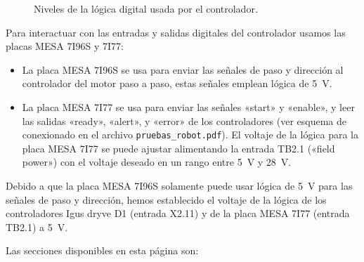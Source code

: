 \documentclass[english,spanish,a4paper,11pt]{article}
\begin{document}
\begin{figure}[!ht]
    \centering
    
    \caption{Niveles de la lógica digital usada por el controlador.}
    \label{fig:controller_logic_levels}
\end{figure}

Para interactuar con las entradas y salidas digitales del controlador usamos las placas MESA 7I96S y 7I77:
\begin{itemize}
    \item La placa MESA 7I96S se usa para enviar las señales de paso y dirección al controlador del motor paso a paso, estas señales emplean lógica de \qty{5}{\V}.

    \item La placa MESA 7I77 se usa para enviar las señales «start» y «enable», y leer las salidas «ready», «alert», y «error» de los controladores (ver esquema de conexionado en el archivo \texttt{pruebas\_robot.pdf}). El voltaje de la lógica para la placa MESA 7I77 se puede ajustar alimentando la entrada TB2.1 («field power») con el voltaje deseado en un rango entre \qty{5}{\V} y \qty{28}{\V}.
\end{itemize}

Debido a que la placa MESA 7I96S solamente puede usar lógica de \qty{5}{\V} para las señales de paso y dirección, hemos establecido el voltaje de la lógica de los controladores Igus dryve D1 (entrada X2.11) y de la placa MESA 7I77 (entrada TB2.1) a \qty{5}{\V}. 

Las secciones disponibles en esta página son:
\end{document}
